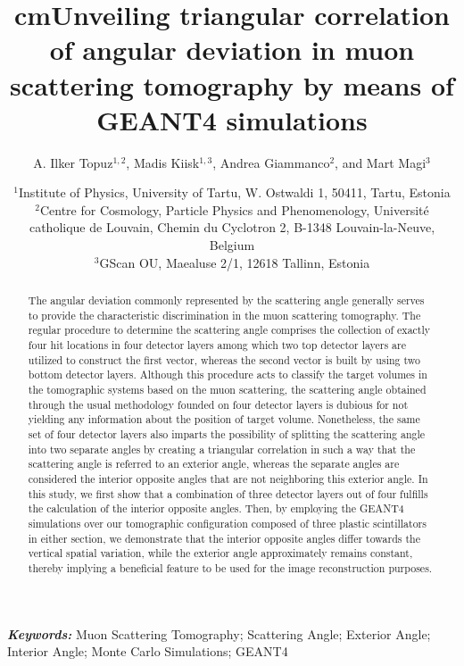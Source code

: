 \documentclass[10.75pt]{article}
\begin{document}
\title{ cm\textbf{Unveiling triangular correlation of angular deviation in muon scattering tomography by means of GEANT4 simulations}}
\medskip
\author{\small A. Ilker Topuz$^{1,2}$, Madis Kiisk$^{1,3}$, Andrea Giammanco$^{2}$, and Mart Magi$^{3}$}
\medskip
\date{\small$^1$Institute of Physics, University of Tartu, W. Ostwaldi 1, 50411, Tartu, Estonia\\
$^2$Centre for Cosmology, Particle Physics and Phenomenology, Universit\'e catholique de Louvain, Chemin du Cyclotron 2, B-1348 Louvain-la-Neuve, Belgium\\
$^3$GScan OU, Maealuse 2/1, 12618 Tallinn, Estonia}
\maketitle
\begin{abstract}
The angular deviation commonly represented by the scattering angle generally serves to provide the characteristic discrimination in the muon scattering tomography. The regular procedure to determine the scattering angle comprises the collection of exactly four hit locations in four detector layers among which two top detector layers are utilized to construct the first vector, whereas the second vector is built by using two bottom detector layers. Although this procedure acts to classify the target volumes in the tomographic systems based on the muon scattering, the scattering angle obtained through the usual methodology founded on four detector layers is dubious for not yielding any information about the position of target volume. Nonetheless, the same set of four detector layers also imparts the possibility of splitting the scattering angle into two separate angles by creating a triangular correlation in such a way that the scattering angle is referred to an exterior angle, whereas the separate angles are considered the interior opposite angles that are not neighboring this exterior angle. In this study, we first show that a combination of three detector layers out of four fulfills the calculation of the interior opposite angles. Then, by employing the GEANT4 simulations over our tomographic configuration composed of three plastic scintillators in either section, we demonstrate that the interior opposite angles differ towards the vertical spatial variation, while the exterior angle approximately remains constant, thereby implying a beneficial feature to be used for the image reconstruction purposes.
\end{abstract}
\textbf{\textit{Keywords: }}  Muon Scattering Tomography; Scattering Angle; Exterior Angle; Interior Angle; Monte Carlo Simulations; GEANT4
\end{document}
